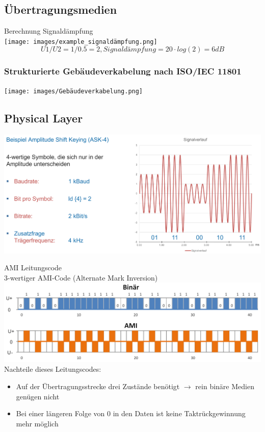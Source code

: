 \subsection*{Übertragungsmedien}

\begin{example2}{Berechnung Signaldämpfung}\\
    \texttt{[image: images/example\_signaldämpfung.png]}
    $$U1/U2 = 1/0.5 = 2, Signaldämpfung = 20 \cdot log(2) = 6dB$$
\end{example2}

\subsubsection{Strukturierte Gebäudeverkabelung nach ISO/IEC 11801}
        \centering
        \texttt{[image: images/Gebäudeverkabelung.png]}

\subsection*{Physical Layer}

\begin{example}
    \includegraphics[width=1\linewidth]{images/amplitude_shift_keying.png}
\end{example}

\begin{concept}{AMI Leitungscode}\\
    3-wertiger AMI-Code (Alternate Mark Inversion)\\
    \includegraphics[width=0.8\linewidth]{images/gleichspannungsfreiheit.png}\\
    Nachteile dieses Leitungscodes:
    \begin{itemize}
        \item Auf der Übertragungsstrecke drei Zustände benötigt $\rightarrow$ rein binäre Medien genügen nicht
        \item Bei einer längeren Folge von 0 in den Daten ist keine Taktrückgewinnung mehr möglich
    \end{itemize}
\end{concept}

